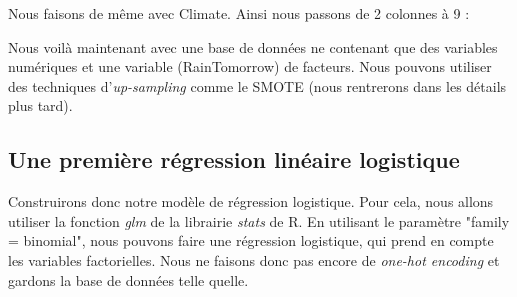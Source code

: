 \documentclass{article}
\begin{document}
Nous faisons de même avec Climate. Ainsi nous passons de 2 colonnes à 9 : 

\begin{table}[ht]
    \centering
    \caption{Extrait du début des variables après \emph{one-hot encoding} des variables Season et Climate.}
\end{table}

Nous voilà maintenant avec une base de données ne contenant que des variables numériques et une variable (RainTomorrow) de facteurs. Nous pouvons utiliser des techniques d'\emph{up-sampling} comme le SMOTE (nous rentrerons dans les détails plus tard).

\subsection{Une première régression linéaire logistique}

Construirons donc notre modèle de régression logistique. Pour cela, nous allons utiliser la fonction \emph{glm} de la librairie \emph{stats} \cite{stats} de R. En utilisant le paramètre "family = binomial", nous pouvons faire une régression logistique, qui prend en compte les variables factorielles. Nous ne faisons donc pas encore de \emph{one-hot encoding} et gardons la base de données telle quelle. 
\end{document}
